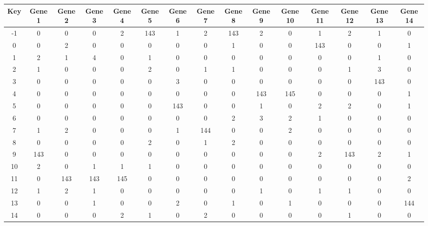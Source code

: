 \begin{tabular}{|c|c|c|c|c|c|c|c|c|c|c|c|c|c|c|}
\hline
Key & Gene 1 & Gene 2 & Gene 3 & Gene 4 & Gene 5 & Gene 6 & Gene 7 & Gene 8 & Gene 9 & Gene 10 & Gene 11 & Gene 12 & Gene 13 & Gene 14 \\
\hline
-1 & 0 & 0 & 0 & 2 & 143 & 1 & 2 & 143 & 2 & 0 & 1 & 2 & 1 & 0 \\
0 & 0 & 2 & 0 & 0 & 0 & 0 & 0 & 1 & 0 & 0 & 143 & 0 & 0 & 1 \\
1 & 2 & 1 & 4 & 0 & 1 & 0 & 0 & 0 & 0 & 0 & 0 & 0 & 1 & 0 \\
2 & 1 & 0 & 0 & 0 & 2 & 0 & 1 & 1 & 0 & 0 & 0 & 1 & 3 & 0 \\
3 & 0 & 0 & 0 & 0 & 0 & 3 & 0 & 0 & 0 & 0 & 0 & 0 & 143 & 0 \\
4 & 0 & 0 & 0 & 0 & 0 & 0 & 0 & 0 & 143 & 145 & 0 & 0 & 0 & 1 \\
5 & 0 & 0 & 0 & 0 & 0 & 143 & 0 & 0 & 1 & 0 & 2 & 2 & 0 & 1 \\
6 & 0 & 0 & 0 & 0 & 0 & 0 & 0 & 2 & 3 & 2 & 1 & 0 & 0 & 0 \\
7 & 1 & 2 & 0 & 0 & 0 & 1 & 144 & 0 & 0 & 2 & 0 & 0 & 0 & 0 \\
8 & 0 & 0 & 0 & 0 & 2 & 0 & 1 & 2 & 0 & 0 & 0 & 0 & 0 & 0 \\
9 & 143 & 0 & 0 & 0 & 0 & 0 & 0 & 0 & 0 & 0 & 2 & 143 & 2 & 1 \\
10 & 2 & 0 & 1 & 1 & 1 & 0 & 0 & 0 & 0 & 0 & 0 & 0 & 0 & 0 \\
11 & 0 & 143 & 143 & 145 & 0 & 0 & 0 & 0 & 0 & 0 & 0 & 0 & 0 & 2 \\
12 & 1 & 2 & 1 & 0 & 0 & 0 & 0 & 0 & 1 & 0 & 1 & 1 & 0 & 0 \\
13 & 0 & 0 & 1 & 0 & 0 & 2 & 0 & 1 & 0 & 1 & 0 & 0 & 0 & 144 \\
14 & 0 & 0 & 0 & 2 & 1 & 0 & 2 & 0 & 0 & 0 & 0 & 1 & 0 & 0 \\
\hline
\end{tabular}